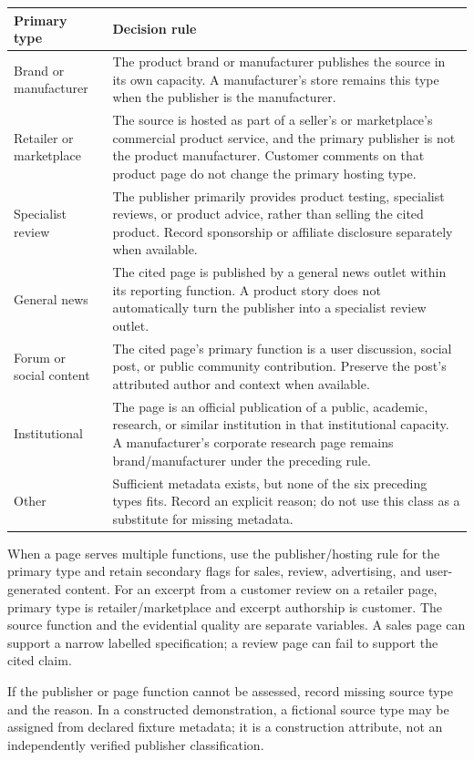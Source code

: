 \documentclass[10pt,a4paper]{article}
\begin{document}
\begin{longtable}{L{3.8cm}L{11.6cm}}
\toprule Primary type & Decision rule \\
\midrule\endhead
Brand or manufacturer & The product brand or manufacturer publishes the source in its own capacity. A manufacturer's store remains this type when the publisher is the manufacturer. \\
Retailer or marketplace & The source is hosted as part of a seller's or marketplace's commercial product service, and the primary publisher is not the product manufacturer. Customer comments on that product page do not change the primary hosting type. \\
Specialist review & The publisher primarily provides product testing, specialist reviews, or product advice, rather than selling the cited product. Record sponsorship or affiliate disclosure separately when available. \\
General news & The cited page is published by a general news outlet within its reporting function. A product story does not automatically turn the publisher into a specialist review outlet. \\
Forum or social content & The cited page's primary function is a user discussion, social post, or public community contribution. Preserve the post's attributed author and context when available. \\
Institutional & The page is an official publication of a public, academic, research, or similar institution in that institutional capacity. A manufacturer's corporate research page remains brand/manufacturer under the preceding rule. \\
Other & Sufficient metadata exists, but none of the six preceding types fits. Record an explicit reason; do not use this class as a substitute for missing metadata. \\
\bottomrule
\end{longtable}

When a page serves multiple functions, use the publisher/hosting rule for the primary type and retain secondary flags for sales, review, advertising, and user-generated content. For an excerpt from a customer review on a retailer page, primary type is retailer/marketplace and excerpt authorship is customer. The source function and the evidential quality are separate variables. A sales page can support a narrow labelled specification; a review page can fail to support the cited claim.

If the publisher or page function cannot be assessed, record missing source type and the reason. In a constructed demonstration, a fictional source type may be assigned from declared fixture metadata; it is a construction attribute, not an independently verified publisher classification.
\end{document}
